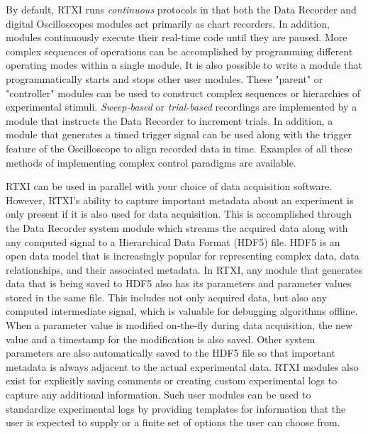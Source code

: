 By default, RTXI runs \emph{continuous} protocols in that both the Data Recorder and digital Oscilloscopes modules act primarily as chart recorders. In addition, modules continuously execute their real-time code until they are paused. More complex sequences of operations can be accomplished by programming different operating modes within a single module. It is also possible to write a module that programmatically starts and stops other user modules. These "parent" or "controller" modules can be used to construct complex sequences or hierarchies of experimental stimuli. \emph{Sweep-based} or \emph{trial-based} recordings are implemented by a module that instructs the Data Recorder to increment trials. In addition, a module that generates a timed trigger signal can be used along with the trigger feature of the Oscilloscope to align recorded data in time. Examples of all these methods of implementing complex control paradigms are available.

RTXI can be used in parallel with your choice of data acquisition software. However, RTXI's ability to capture important metadata about an experiment is only present if it is also used for data acquisition. This is accomplished through the Data Recorder system module which streams the acquired data along with any computed signal to a Hierarchical Data Format (HDF5) file. HDF5 is an open data model that is increasingly popular for representing complex data, data relationships, and their associated metadata. In RTXI, any module that generates data that is being saved to HDF5 also has its parameters and parameter values stored in the same file. This includes not only acquired data, but also any computed intermediate signal, which is valuable for debugging algorithms offline. When a parameter value is modified on-the-fly during data acquisition, the new value and a timestamp for the modification is also saved. Other system parameters are also automatically saved to the HDF5 file so that important metadata is always adjacent to the actual experimental data. RTXI modules also exist for explicitly saving comments or creating custom experimental logs to capture any additional information. Such user modules can be used to standardize experimental logs by providing templates for information that the user is expected to supply or a finite set of options the user can choose from.

